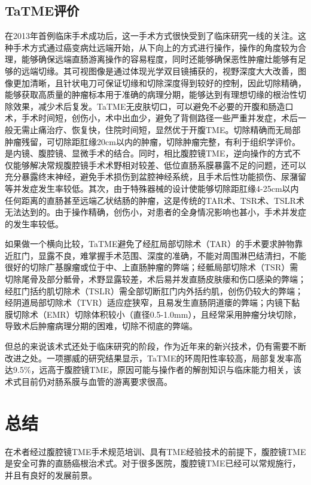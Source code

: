 \documentclass[a4paper,11pt,onecolumn,twoside]{article}
\begin{document}
\begin{multicols}{2}
    \subsection{TaTME评价}
    在2013年首例临床手术成功后，这一手术方式很快受到了临床研究一线的关注。这种手术方式通过癌变病灶远端开始，从下向上的方式进行操作，操作的角度较为合理，能够确保远端直肠游离操作的容易程度，同时还能够确保恶性肿瘤灶能够有足够的远端切缘。其可视图像是通过体现光学双目镜捕获的，视野深度大大改善，图像更加清晰，且针状电刀可保证切缘和切除深度得到较好的控制，因此切除精确，能够获取高质量的肿瘤标本用于准确的病理分期，能够达到有理想切缘的根治性切除效果，减少术后复发。TaTME无皮肤切口，可以避免不必要的开腹和肠造口术，手术时间短，创伤小，术中出血少，避免了背侧路径一些严重并发症，术后一般无需止痛治疗、恢复快，住院时间短，显然优于开腹TME。切除精确而无局部肿瘤残留，可切除距肛缘20cm以内的肿瘤，切除肿瘤完整，有利于组织学评价。是内镜、腹腔镜、显微手术的结合。同时，相比腹腔镜TME，逆向操作的方式不仅能够解决常规腹腔镜手术术野相对较差、低位直肠系膜暴露不足的问题，还可以充分暴露终末神经，避免手术损伤到盆腔神经系统，且手术后性功能损伤、尿潴留等并发症发生率较低\supercite{W8}。其次，由于特殊器械的设计使能够切除距肛缘4-25cm以内任何距离的直肠甚至远端乙状结肠的肿瘤，这是传统的TAR术、TSR术、TSLR术无法达到的。由于操作精确，创伤小，对患者的全身情况影响也甚小，手术并发症的发生率较低\supercite{W2,W6}。

    如果做一个横向比较，TaTME避免了经肛局部切除术（TAR）的手术要求肿物靠近肛门，显露不良，难掌握手术范围、深度的准确，不能对周围淋巴结清扫，不能很好的切除广基腺瘤或位于中、上直肠肿瘤的弊端；经骶局部切除术（TSR）需切除尾骨及部分骶骨，术野显露较差，术后易并发直肠皮肤瘘和伤口感染的弊端；经肛门括约肌切除术（TSLR）需全部切断肛门内外括约肌，创伤仍较大的弊端；经阴道局部切除术（TVR）适应症狭窄，且易发生直肠阴道瘘的弊端；内镜下黏膜切除术（EMR）切除体积较小（直径0.5-1.0mm），且经常采用肿瘤分块切除，导致术后肿瘤病理分期的困难，切除不彻底的弊端。

    但总的来说该术式还处于临床研究的阶段，作为近年来的新兴技术，仍有需要不断改进之处。一项挪威的研究结果显示，TaTME的环周阳性率较高，局部复发率高达9.5\%，远高于腹腔镜TME，原因可能与操作者的解剖知识与临床能力相关，该术式目前仍对肠系膜与血管的游离要求很高\supercite{W7}。

    \section{总结}
    在术者经过腹腔镜TME手术规范培训、具有TME经验技术的前提下，腹腔镜TME是安全可靠的直肠癌根治术式。对于很多医院，腹腔镜TME已经可以常规施行，并且有良好的发展前景。


\end{multicols}
\end{document}
